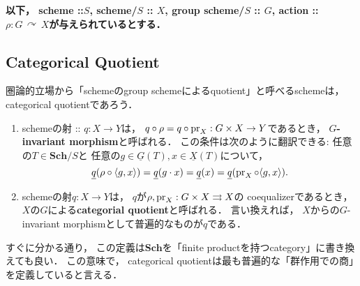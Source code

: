 \documentclass[a4paper]{jsarticle}
\newcommand{\Sch}{\mathbf{Sch}}
\newcommand{\func}[1]{\underline{#1}}
\newcommand{\acton}{\,\curvearrowright\,}
\begin{document}
    \textbf
    {
    以下，
    scheme ::$S$,
    scheme/$S$ :: $X$,
    group scheme/$S$ :: $G$,
    action :: $\rho: G \acton X$が与えられているとする．
    }

    \subsection{Categorical Quotient}
    圏論的立場から「schemeのgroup schemeによるquotient」と呼べるschemeは，
    categorical quotientであろう．
    \begin{Def}
    \begin{enumerate}[label=(\roman*), leftmargin=*]
        \item
            schemeの射 :: $q: X \to Y$は，
            $q \circ \rho=q \circ \operatorname{pr}_X: G \times X \to Y$であるとき，
            \textbf{$G$-invariant morphism}と呼ばれる．
            この条件は次のように翻訳できる:
            任意の$T \in \Sch/S$と
            任意の$g \in \func{G}(T), x \in \func{X}(T)$について，
            \[
                \func{q}(\rho \circ \langle g,x\rangle)
                =\func{q}(g \cdot x)
                =\func{q}(x)
                =\func{q}(\pr_X \circ \langle g,x \rangle).
            \]

        \item
            schemeの射$q: X \to Y$は，
            $q$が$\rho, \operatorname{pr}_X: G \times X \rightrightarrows X$の
            coequalizerであるとき，
            $X$の$G$による\textbf{categorial quotient}と呼ばれる．
            言い換えれば，
            $X$からの$G$-invariant morphismとして普遍的なものが$q$である．


    \end{enumerate}
    \end{Def}
    すぐに分かる通り，
    この定義は$\Sch$を「finite productを持つcategory」に書き換えても良い．
    この意味で，
    categorical quotientは最も普遍的な「群作用での商」を定義していると言える．
\end{document}
